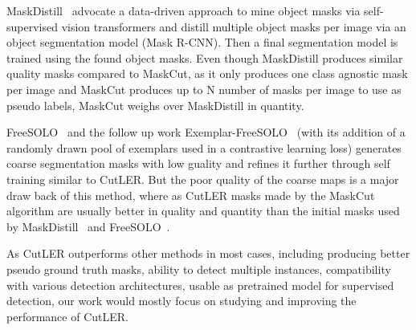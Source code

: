 MaskDistill~\cite{vangansbeke2022discovering} advocate a data-driven approach to mine object masks via self-supervised vision transformers and distill multiple object masks per image via an object segmentation model (Mask R-CNN). Then a final segmentation model is trained using the found object masks. Even though MaskDistill produces similar quality masks compared to MaskCut, as it only produces one class agnostic mask per image and MaskCut produces up to N number of masks per image to use as pseudo labels, MaskCut weighs over MaskDistill in quantity.

FreeSOLO~\cite{wang2022freesolo} and the follow up work Exemplar-FreeSOLO~\cite{Ishtiak_2023_CVPR} (with its addition of a randomly drawn pool of exemplars used in a contrastive learning loss) generates coarse segmentation masks with low guality and refines it further through self training similar to CutLER. But the poor quality of the coarse maps is a major draw back of this method, where as CutLER masks made by the MaskCut~\cite{wang2023cut, wang2022tokencut} algorithm are usually better in quality and quantity than the initial masks used by MaskDistill~\cite{vangansbeke2022discovering} and FreeSOLO~\cite{wang2022freesolo}. 

As CutLER outperforms other methods in most cases, including producing better pseudo ground truth masks, ability to detect multiple instances, compatibility with various detection architectures, usable as pretrained model for supervised detection, our work would mostly focus on studying and improving the performance of CutLER.

%
